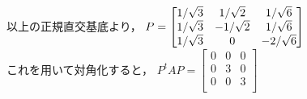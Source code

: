 \documentclass[a4paper]{jsarticle}
\begin{document}
以上の正規直交基底より，
$
	P =
	\begin{bmatrix}
		1/\sqrt{3} & 1/\sqrt{2}  & 1/\sqrt{6}  \\
		1/\sqrt{3} & -1/\sqrt{2} & 1/\sqrt{6}  \\
		1/\sqrt{3} & 0           & -2/\sqrt{6} \\
	\end{bmatrix}\\
$\\

これを用いて対角化すると，
$P^tAP =
	\begin{bmatrix}
		0 & 0 & 0 \\
		0 & 3 & 0 \\
		0 & 0 & 3 \\
	\end{bmatrix}
$
\end{document}
